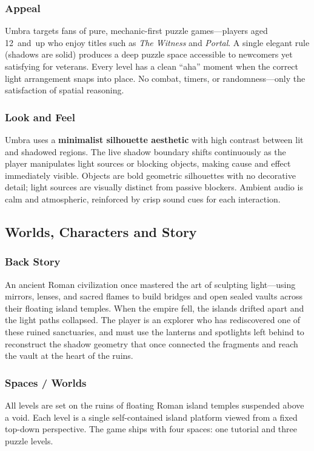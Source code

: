 \documentclass[11pt, letterpaper]{article}
\begin{document}
        \subsubsection{Appeal}
        Umbra targets fans of pure, mechanic-first puzzle games---players aged 12~and~up
        who enjoy titles such as \textit{The Witness} and \textit{Portal}. A single
        elegant rule (shadows are solid) produces a deep puzzle space accessible to
        newcomers yet satisfying for veterans. Every level has a clean ``aha'' moment
        when the correct light arrangement snaps into place. No combat, timers, or
        randomness---only the satisfaction of spatial reasoning.

        \subsubsection{Look and Feel}
        Umbra uses a \textbf{minimalist silhouette aesthetic} with high contrast between
        lit and shadowed regions. The live shadow boundary shifts continuously as the
        player manipulates light sources or blocking objects, making cause and effect
        immediately visible. Objects are bold geometric silhouettes with no decorative
        detail; light sources are visually distinct from passive blockers. Ambient audio
        is calm and atmospheric, reinforced by crisp sound cues for each interaction.

    \subsection{Worlds, Characters and Story}

        \subsubsection{Back Story}
        An ancient Roman civilization once mastered the art of sculpting light---using
        mirrors, lenses, and sacred flames to build bridges and open sealed vaults across
        their floating island temples. When the empire fell, the islands drifted apart
        and the light paths collapsed. The player is an explorer who has rediscovered one
        of these ruined sanctuaries, and must use the lanterns and spotlights left behind
        to reconstruct the shadow geometry that once connected the fragments and reach the
        vault at the heart of the ruins.

        \subsubsection{Spaces / Worlds}
        All levels are set on the ruins of floating Roman island temples suspended above
        a void. Each level is a single self-contained island platform viewed from a fixed
        top-down perspective. The game ships with four spaces: one tutorial and three
        puzzle levels.
\end{document}
